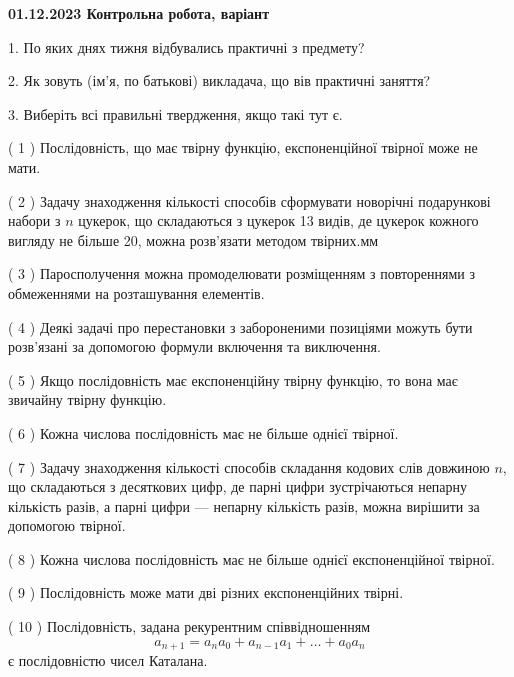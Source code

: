 \documentclass[12pt, ukrainian]{article}
\begin{document}
\vspace{4mm}
\newpage
\begin {large}

\textbf{01.12.2023 Контрольна робота, варіант  }\par


{
1. По яких днях тижня відбувались практичні з предмету?



\vspace{5mm}
2. Як зовуть (ім'я, по батькові) викладача, що вів практичні заняття?



\vspace{5mm}
3. Виберіть всі правильні твердження, якщо такі тут є.\par
\vspace{2mm}
( 1 ) Послідовність, що має твірну функцію, експоненційної твірної може не мати.%

( 2 ) Задачу знаходження кількості способів сформувати новорічні подарункові набори з $n$ цукерок, що складаються з цукерок 13 видів, де цукерок кожного вигляду не більше 20, можна розв’язати методом твірних.мм%

( 3 ) Паросполучення можна промоделювати розміщенням з повтореннями з обмеженнями на розташування елементів.%

( 4 ) Деякі задачі про перестановки з забороненими позиціями можуть бути розв’я\-за\-ні за допомогою формули включення та виключення.%

( 5 ) Якщо послідовність має експоненційну твірну функцію, то вона має звичайну твірну функцію.%

( 6 ) Кожна числова послідовність має не більше однієї твірної.%

( 7 ) Задачу знаходження кількості способів складання кодових слів довжиною $n$, що складаються з десяткових цифр, де парні цифри зустрічаються непарну кількість разів, а парні цифри — непарну кількість разів, можна вирішити за допомогою твірної.%

( 8 ) Кожна числова послідовність має не більше однієї  експоненційної твірної.%

( 9 ) Послідовність може мати дві різних експоненційних твірні.%

( 10 ) Послідовність, задана рекурентним співвідношенням $$a_{n+1}=a_{n}a_{0}+a_{n-1}a_{1}+\ldots+a_0a_{n}$$ є послідовністю чисел Каталана.%
}
\end {large}
\end{document}
